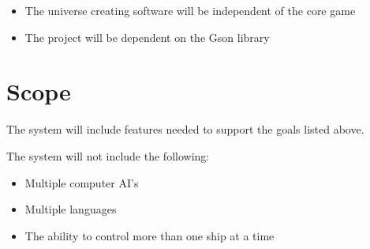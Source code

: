 \begin{itemize}
	\item The universe creating software will be independent of the core game
	\item The project will be dependent on the Gson library
\end{itemize}

\section{Scope}

The system will include features needed to support the goals listed above.

The system will not include the following:

\begin{itemize}
	\item Multiple computer AI's
	\item Multiple languages
	\item The ability to control more than one ship at a time
\end{itemize}
